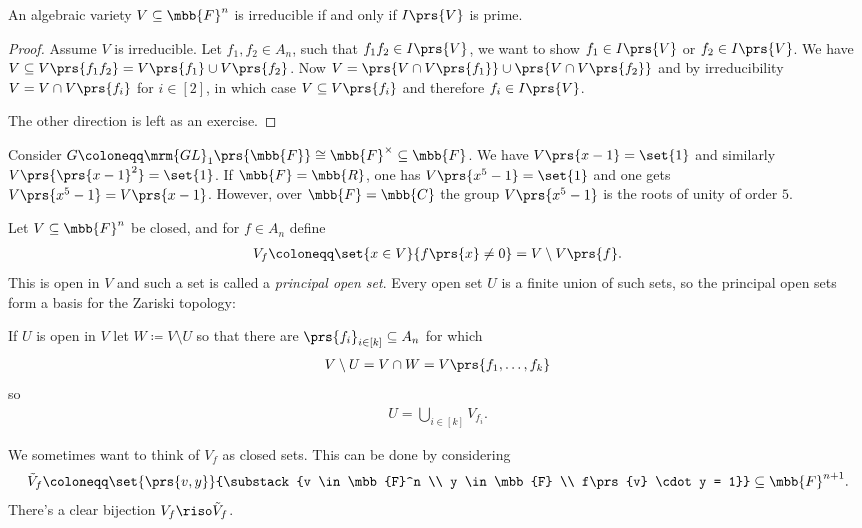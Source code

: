 \documentclass[10pt,a4paper,twoside,openany,hidelinks]{book}
\begin{document}
\begin{proposition}
An algebraic variety $V \subseteq \mbb{F}^n$ is irreducible if and only if $I\prs{V}$ is prime.
\end{proposition}

\begin{proof}
Assume $V$ is irreducible. Let $f_1, f_2 \in A_n$, such that $f_1 f_2 \in I\prs{V}$, we want to show $f_1 \in I\prs{V}$ or $f_2 \in I\prs{V}$. We have $V \subseteq V\prs{f_1 f_2} = V\prs{f_1} \cup V\prs{f_2}$. Now $V = \prs{V \cap V\prs{f_1}} \cup \prs{V \cap V\prs{f_2}}$ and by irreducibility $V = V \cap V\prs{f_i}$ for $i \in [2]$, in which case $V \subseteq V\prs{f_i}$ and therefore $f_i \in I\prs{V}$.

The other direction is left as an exercise.
\end{proof}


\begin{example}
Consider $G \coloneqq \mrm{GL}_1\prs{\mbb{F}} \cong \mbb{F}^\times \subseteq \mbb{F}$.
We have $V\prs{x-1} = \set{1}$ and similarly $V\prs{\prs{x-1}^2} = \set{1}$. If $\mbb{F} = \mbb{R}$, one has $V\prs{x^5 - 1} = \set{1}$ and one gets $V\prs{x^5 - 1} = V\prs{x-1}$.
However, over $\mbb{F} = \mbb{C}$ the group $V\prs{x^5 - 1}$ is the roots of unity of order $5$.
\end{example}

\begin{example}
Let $V \subseteq \mbb{F}^n$ be closed, and for $f \in A_n$ define
\begin{align*}
V_f \coloneqq \set{x \in V}{f\prs{x} \neq 0} = V \setminus V\prs{f} \text{.}
\end{align*}
This is open in $V$ and such a set is called a \emph{principal open set}.
Every open set $U$ is a finite union of such sets, so the principal open sets form a basis for the Zariski topology:

If $U$ is open in $V$ let $W \coloneqq V \setminus U$ so that there are $\prs{f_i}_{i \in [k]} \subseteq A_n$ for which
\begin{align*}
V \setminus U = V \cap W = V\prs{f_1, \ldots, f_k}
\end{align*}
so
\begin{align*}
U = \bigcup_{i \in [k]} V_{f_i} \text{.}
\end{align*}

We sometimes want to think of $V_f$ as closed sets. This can be done by considering
\begin{align*}
\tilde{V}_f \coloneqq \set{\prs{v,y}}{\substack{v \in \mbb{F}^n \\ y \in \mbb{F} \\ f\prs{v} \cdot y = 1}} \subseteq \mbb{F}^{n+1} \text{.}
\end{align*}
There's a clear bijection $V_f \riso \tilde{V}_f$.
\end{example}
\end{document}
